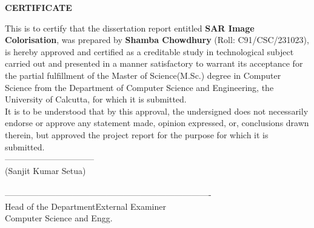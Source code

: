 \begin{center}
    {\large {\bf CERTIFICATE}}
\end{center}

This is to certify that the dissertation report entitled \textbf{SAR Image Colorisation}, was prepared by \textbf{Shamba Chowdhury} (Roll: C91/CSC/231023), is hereby approved and certified as a creditable study in technological subject carried out and presented in a manner satisfactory to warrant its acceptance for the partial fulfillment of the Master of Science(M.Sc.) degree in Computer Science from the Department of Computer Science and Engineering, the University of Calcutta, for which it is submitted. \\
It is to be understood that by this approval, the undersigned does not necessarily endorse or approve any statement made, opinion expressed, or, conclusions drawn therein, but approved the project report for the purpose for which it is submitted.
\\[.5cm]

\large{--------------------------------}\\
\hspace*{.4in}\large{(Sanjit Kumar Setua)}\\
\hspace*{.5in}\\[1.0cm]

\large{---------------------------------------}\hspace*{1.5in}\large{----------------------------------}\\
\hspace*{.4in}\large{Head of the Department}\hspace*{2.2in}\large{External Examiner}
\\[0.1cm]
\hspace*{.2in}Computer Science and Engg.